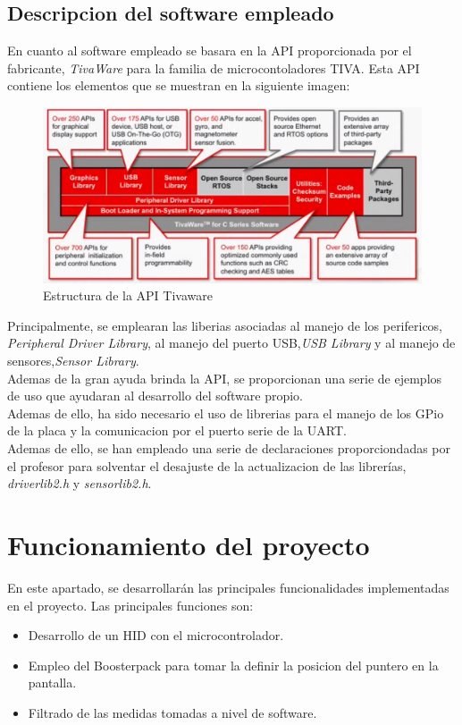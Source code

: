 \documentclass[a4paper,twoside]{article}
\begin{document}
\subsection{Descripcion del software empleado}
En cuanto al software empleado se basara en la API proporcionada por el fabricante, \textit{TivaWare} para la familia de microcontoladores TIVA. Esta API contiene los elementos que se muestran en la siguiente imagen:\\
\begin{figure}[h!]
 \centering
 \includegraphics[width=.8\textwidth]{../images/tivaware_struct}
 \caption{Estructura de la API Tivaware}
\end{figure}

Principalmente, se emplearan las liberias asociadas al manejo de los perifericos, \textit{Peripheral Driver Library}, al manejo del puerto USB,\textit{USB Library} y al manejo de sensores,\textit{Sensor Library}. \\
Ademas de la gran ayuda brinda la API, se proporcionan una serie de ejemplos de uso que ayudaran al desarrollo del software propio. \\

Ademas de ello, ha sido necesario el uso de librerias para el manejo de los GPio de la placa y la comunicacion por el puerto serie de la UART. \\
Ademas de ello, se han empleado una serie de declaraciones proporciondadas por el profesor para solventar el desajuste de la actualizacion de las librerías, \textit{driverlib2.h} y \textit{sensorlib2.h}.

\newpage
\section{Funcionamiento del proyecto}
En este apartado, se desarrollarán las principales funcionalidades implementadas en el proyecto. Las principales funciones son:
\begin{itemize}
\item Desarrollo de un HID con el microcontrolador.
\item Empleo del Boosterpack para tomar la definir la posicion del puntero en la pantalla.
\item Filtrado de las medidas tomadas a nivel de software.
\end{itemize}
\end{document}
